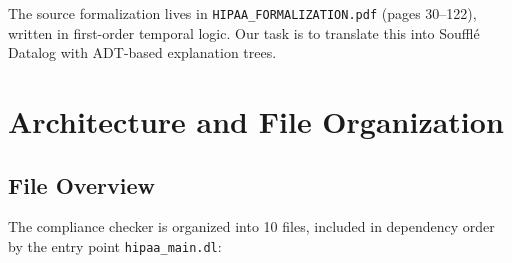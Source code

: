 \documentclass[11pt,letterpaper]{article}
\begin{document}
The source formalization lives in \texttt{HIPAA\_FORMALIZATION.pdf} (pages 30--122), written in first-order temporal logic. Our task is to translate this into Souffl\'{e} Datalog with ADT-based explanation trees.


\section{Architecture and File Organization}
\label{sec:architecture}

\subsection{File Overview}

The compliance checker is organized into 10 files, included in dependency order by the entry point \texttt{hipaa\_main.dl}:
\end{document}
